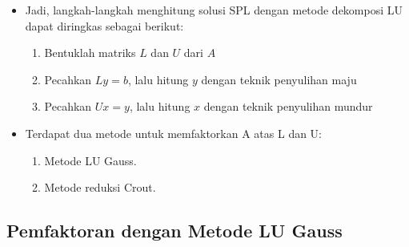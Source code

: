 \documentclass[pdflatex,compress,mathserif]{beamer}
\begin{document}
\begin{frame}
	\begin{itemize}
		\item Jadi, langkah-langkah menghitung solusi SPL dengan metode dekomposi LU dapat diringkas sebagai berikut:
		\begin{enumerate}
			\item Bentuklah matriks $ L $ dan $ U $ dari $ A $
			\item Pecahkan $ Ly = b $, lalu hitung $ y $ dengan teknik penyulihan maju
			\item Pecahkan $ Ux = y $, lalu hitung $ x $ dengan teknik penyulihan mundur
		\end{enumerate}
		\item Terdapat dua metode untuk memfaktorkan A atas L dan U:
		\begin{enumerate}
			\item Metode LU Gauss.
			\item Metode reduksi Crout.
		\end{enumerate}
	\end{itemize}
\end{frame}

\subsection{Pemfaktoran dengan Metode LU Gauss}
\end{document}
